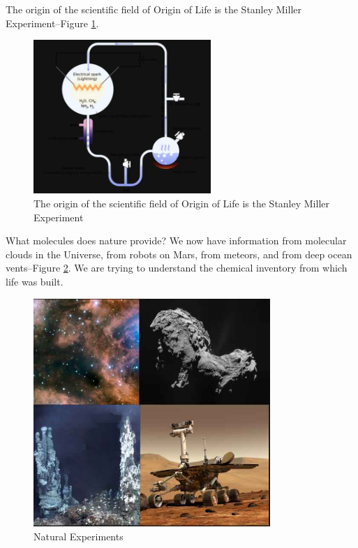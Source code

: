 \documentclass[]{article}
\begin{document}
\begin{figure}[H]
\begin{subfigure}[b]{0.35\textwidth}
	\end{subfigure}
\end{figure}

The origin of the scientific field of Origin of Life is the Stanley Miller Experiment\cite{ferus2017formation,miller1953production}--Figure \ref{fig:StanleyMillar}.

\begin{figure}[H]
	\begin{center}
		\caption[The Stanley Miller Experiment]{The origin of the scientific field of Origin of Life is the Stanley Miller Experiment}\label{fig:StanleyMillar}
		\includegraphics[width=0.6\textwidth]{StanleyMillar}
	\end{center}
\end{figure}

What molecules does nature provide? We now have information from molecular clouds in the Universe, from robots on Mars, from meteors, and from deep ocean vents--Figure \ref{fig:NaturalExperiments}. We are trying to understand the chemical inventory from which life was built.
\begin{figure}[H]
	\begin{center}
		\caption{Natural Experiments}\label{fig:NaturalExperiments}
		\includegraphics[width=0.8\textwidth]{NaturalExperiments}
	\end{center}
\end{figure}
\end{document}
